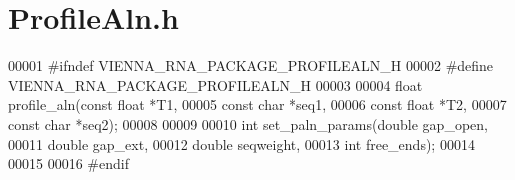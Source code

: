 \hypertarget{ProfileAln_8h_source}{}\section{Profile\+Aln.\+h}
\label{ProfileAln_8h_source}

\begin{DoxyCode}
00001 \textcolor{preprocessor}{#ifndef VIENNA\_RNA\_PACKAGE\_PROFILEALN\_H}
00002 \textcolor{preprocessor}{#define VIENNA\_RNA\_PACKAGE\_PROFILEALN\_H}
00003 
00004 \textcolor{keywordtype}{float} profile\_aln(\textcolor{keyword}{const} \textcolor{keywordtype}{float} *T1,
00005                   \textcolor{keyword}{const} \textcolor{keywordtype}{char}  *seq1,
00006                   \textcolor{keyword}{const} \textcolor{keywordtype}{float} *T2,
00007                   \textcolor{keyword}{const} \textcolor{keywordtype}{char}  *seq2);
00008 
00009 
00010 \textcolor{keywordtype}{int} set\_paln\_params(\textcolor{keywordtype}{double}  gap\_open,
00011                     \textcolor{keywordtype}{double}  gap\_ext,
00012                     \textcolor{keywordtype}{double}  seqweight,
00013                     \textcolor{keywordtype}{int}     free\_ends);
00014 
00015 
00016 \textcolor{preprocessor}{#endif}
\end{DoxyCode}

